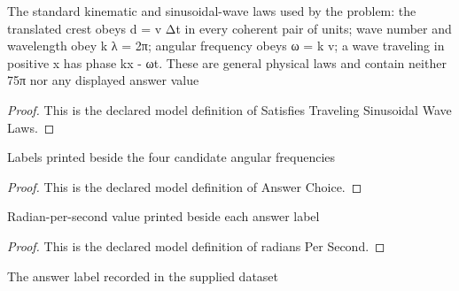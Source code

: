 \begin{definition}
  \label{def:physics:phyx-mini-0289:phyxminiproblems-problemphyxmini0289-satisfiestravelingsinusoidalwavelaws}
  The standard kinematic and sinusoidal-wave laws used by the problem: the translated crest obeys d = v Δt in every coherent pair of units; wave number and wavelength obey k λ = 2π; angular frequency obeys ω = k v; a wave traveling in positive x has phase kx - ωt. These are general physical laws and contain neither 75π nor any displayed answer value
\end{definition}
\begin{proof}
  This is the declared model definition of Satisfies Traveling Sinusoidal Wave Laws.
\end{proof}
\begin{definition}
  \label{def:physics:phyx-mini-0289:phyxminiproblems-problemphyxmini0289-answerchoice}
  Labels printed beside the four candidate angular frequencies
\end{definition}
\begin{proof}
  This is the declared model definition of Answer Choice.
\end{proof}
\begin{definition}
  \label{def:physics:phyx-mini-0289:phyxminiproblems-problemphyxmini0289-answerchoice-radianspersecond}
  Radian-per-second value printed beside each answer label
\end{definition}
\begin{proof}
  This is the declared model definition of radians Per Second.
\end{proof}
\begin{definition}
  \label{def:physics:phyx-mini-0289:phyxminiproblems-problemphyxmini0289-recordedanswerchoice}
  The answer label recorded in the supplied dataset
\end{definition}

